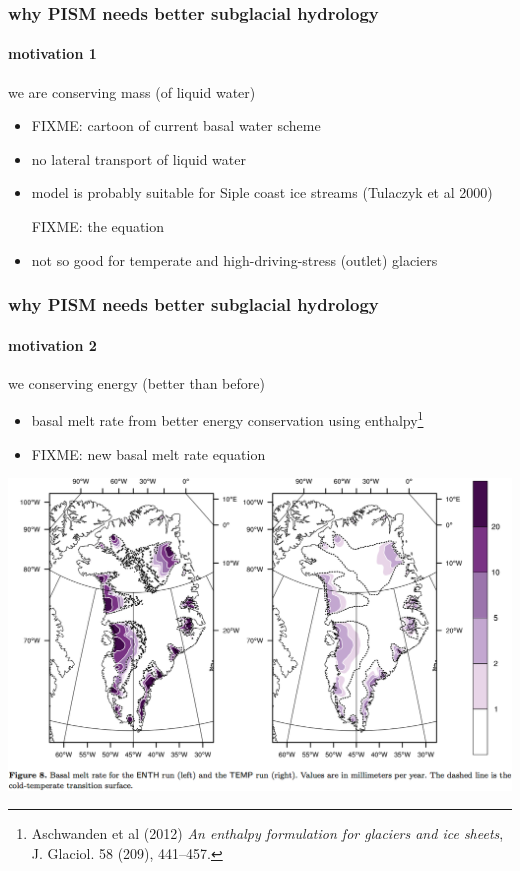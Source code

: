 \documentclass[hide notes,intlimits]{beamer}
\begin{document}
\newcommand{\whytitle}{why PISM needs better subglacial hydrology}

\begin{frame}
  \frametitle{\whytitle}
  \framesubtitle{motivation 1}

\begin{center}
  we are  conserving mass (of liquid water)
\end{center}

  \begin{itemize}
    \item FIXME:  cartoon of current basal water scheme
    \item no lateral transport of liquid water
    \item model is probably suitable for Siple coast ice streams (Tulaczyk et al 2000)
    
    FIXME: the equation
    \item not so good for temperate and high-driving-stress (outlet) glaciers
  \end{itemize}
\end{frame}


\begin{frame}
  \frametitle{\whytitle}
  \framesubtitle{motivation 2}
  
\begin{center}
  we  conserving energy (better than before)
\end{center}
  
  \begin{itemize}
    \item basal melt rate from better energy conservation using enthalpy\footnote{\tiny Aschwanden et al (2012) \emph{An enthalpy formulation for glaciers and ice sheets}, J. Glaciol. 58 (209), 441--457.}
    \item FIXME: new basal melt rate equation
  \end{itemize}

  \begin{center}
    \includegraphics[height=0.7\textheight]{figs/enthalpy-model.png}
  \end{center}
\end{frame}
\end{document}
